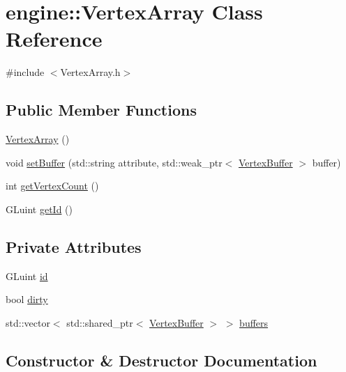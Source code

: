 \hypertarget{classengine_1_1_vertex_array}{}\section{engine\+:\+:Vertex\+Array Class Reference}
\label{classengine_1_1_vertex_array}


{\ttfamily \#include $<$Vertex\+Array.\+h$>$}

\subsection*{Public Member Functions}
\begin{DoxyCompactItemize}
\item 
\mbox{\hyperlink{classengine_1_1_vertex_array_a0aedfcbe62db51023f0ea76ef6dfacf3}{Vertex\+Array}} ()
\item 
void \mbox{\hyperlink{classengine_1_1_vertex_array_a1aae003f11e7f028131b582b21ac3e20}{set\+Buffer}} (std\+::string attribute, std\+::weak\+\_\+ptr$<$ \mbox{\hyperlink{classengine_1_1_vertex_buffer}{Vertex\+Buffer}} $>$ buffer)
\item 
int \mbox{\hyperlink{classengine_1_1_vertex_array_a52784835eb15a6f6e3313abccd19aa7e}{get\+Vertex\+Count}} ()
\item 
G\+Luint \mbox{\hyperlink{classengine_1_1_vertex_array_a37d1f9e369ab5f3b934d6453d8ae4be0}{get\+Id}} ()
\end{DoxyCompactItemize}
\subsection*{Private Attributes}
\begin{DoxyCompactItemize}
\item 
G\+Luint \mbox{\hyperlink{classengine_1_1_vertex_array_af15674f47ec26673a0172c0719575c11}{id}}
\item 
bool \mbox{\hyperlink{classengine_1_1_vertex_array_a1bc7f85879e2629d2f3bca921f84e893}{dirty}}
\item 
std\+::vector$<$ std\+::shared\+\_\+ptr$<$ \mbox{\hyperlink{classengine_1_1_vertex_buffer}{Vertex\+Buffer}} $>$ $>$ \mbox{\hyperlink{classengine_1_1_vertex_array_a289920bd4066486097b28d1cbbb6be07}{buffers}}
\end{DoxyCompactItemize}


\subsection{Constructor \& Destructor Documentation}
\mbox{\label{classengine_1_1_vertex_array_a0aedfcbe62db51023f0ea76ef6dfacf3}} 
